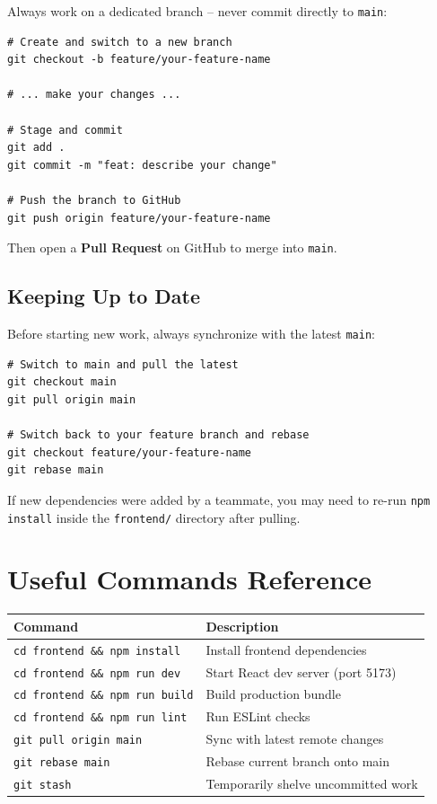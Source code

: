 \documentclass[11pt,a4paper]{article}
\begin{document}
Always work on a dedicated branch -- never commit directly to \texttt{main}:

\begin{lstlisting}
# Create and switch to a new branch
git checkout -b feature/your-feature-name

# ... make your changes ...

# Stage and commit
git add .
git commit -m "feat: describe your change"

# Push the branch to GitHub
git push origin feature/your-feature-name
\end{lstlisting}

Then open a \textbf{Pull Request} on GitHub to merge into \texttt{main}.

\subsection{Keeping Up to Date}

Before starting new work, always synchronize with the latest \texttt{main}:

\begin{lstlisting}
# Switch to main and pull the latest
git checkout main
git pull origin main

# Switch back to your feature branch and rebase
git checkout feature/your-feature-name
git rebase main
\end{lstlisting}

\begin{tipbox}
If new dependencies were added by a teammate, you may need to re-run
\texttt{npm install} inside the \texttt{frontend/} directory after
pulling.
\end{tipbox}

\section{Useful Commands Reference}

\begin{center}
\begin{tabular}{|l|l|}
\hline
\textbf{Command} & \textbf{Description} \\
\hline\hline
\texttt{cd frontend \&\& npm install} & Install frontend dependencies \\
\texttt{cd frontend \&\& npm run dev} & Start React dev server (port 5173) \\
\texttt{cd frontend \&\& npm run build} & Build production bundle \\
\texttt{cd frontend \&\& npm run lint} & Run ESLint checks \\
\hline
\texttt{git pull origin main} & Sync with latest remote changes \\
\texttt{git rebase main} & Rebase current branch onto main \\
\texttt{git stash} & Temporarily shelve uncommitted work \\
\hline
\end{tabular}
\end{center}
\end{document}

